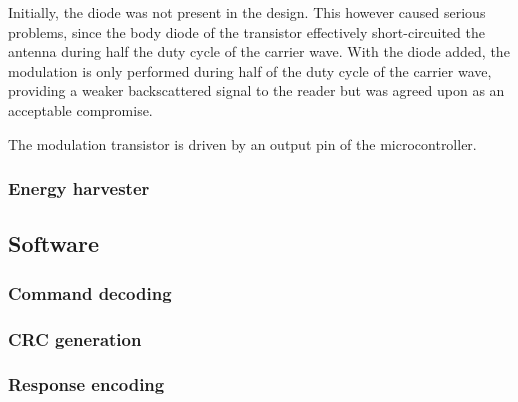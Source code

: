 Initially, the diode was not present in the design.
This however caused serious problems, since the body diode of the transistor effectively short-circuited the antenna during half the duty cycle of the carrier wave.
With the diode added, the modulation is only performed during half of the duty cycle of the carrier wave, providing a weaker backscattered signal to the reader but was agreed upon as an acceptable compromise.

The modulation transistor is driven by an output pin of the microcontroller.

\subsubsection{Energy harvester}


\subsection{Software}

\subsubsection{Command decoding}
\subsubsection{CRC generation}
\subsubsection{Response encoding}
